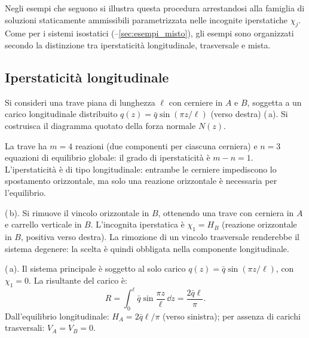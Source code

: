 Negli esempi che seguono si illustra questa
procedura arrestandosi alla famiglia di soluzioni
staticamente ammissibili parametrizzata nelle
incognite iperstatiche $\chi_j$. Come per i
sistemi isostatici (--\ref{sec:esempi_misto}),
gli esempi sono organizzati secondo la distinzione
tra iperstaticità longitudinale, trasversale e
mista.






\subsection{Iperstaticità longitudinale}



\begin{esempio}
	Si consideri una trave piana di lunghezza $\ell$
	con cerniere in $A$ e $B$, soggetta a un carico
	longitudinale distribuito $q(z) =
	\bar{q}\sin(\pi z/\ell)$ (verso destra) (\,a).
	Si costruisca il diagramma quotato della forza normale
	$N(z)$.
	
	\begin{svolgimento}
		



		
		
		
		
		
		La trave ha $m = 4$ reazioni (due componenti
		per ciascuna cerniera) e $n = 3$ equazioni di
		equilibrio globale: il grado di iperstaticità
		è $m - n = 1$. L'iperstaticità è di tipo
		longitudinale: entrambe le cerniere impediscono
		lo spostamento orizzontale, ma solo una
		reazione orizzontale è necessaria per
		l'equilibrio.
		
		(\,b).
		Si rimuove il vincolo orizzontale in $B$,
		ottenendo una trave con cerniera in $A$ e
		carrello verticale in $B$. L'incognita
		iperstatica è $\chi_1 = H_B$ (reazione
		orizzontale in $B$, positiva verso destra).
		La rimozione di un vincolo trasversale
		renderebbe il sistema degenere: la scelta
		è quindi obbligata nella componente
		longitudinale.
		
		(\,a).
		Il sistema principale è soggetto al solo
		carico $q(z) = \bar{q}\sin(\pi z/\ell)$,
		con $\chi_1 = 0$.
		La risultante del carico è:
		\[
		R = \int_0^\ell \bar{q}\sin\frac{\pi z}{\ell}
		\,\dd z
		= \frac{2\bar{q}\ell}{\pi}.
		\]
		Dall'equilibrio longitudinale:
		$H_A = 2\bar{q}\ell/\pi$ (verso sinistra);
		per assenza di carichi trasversali:
		$V_A = V_B = 0$.
		

\end{svolgimento}
\end{esempio}
